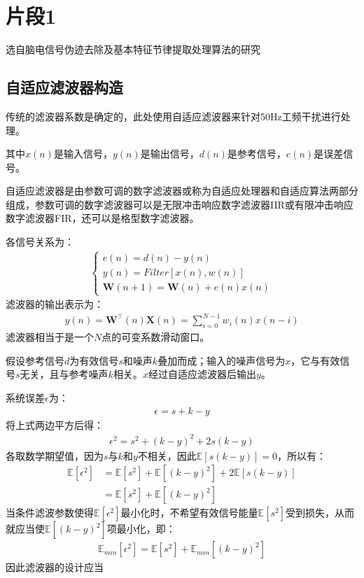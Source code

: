 \documentclass{ctexart}
\begin{document}
	\section{片段1}
		选自脑电信号伪迹去除及基本特征节律提取处理算法的研究\cite{脑电信号伪迹去除及基本特征节律提取处理算法的研究}
		\subsection{自适应滤波器构造}
			传统的滤波器系数是确定的，此处使用自适应滤波器来针对50Hz工频干扰进行处理。\par
			其中$x(n)$是输入信号，$y(n)$是输出信号，$d(n)$是参考信号，$e(n)$是误差信号。\par
			
			自适应滤波器是由参数可调的数字滤波器或称为自适应处理器和自适应算法两部分组成，参数可调的数字滤波器可以是无限冲击响应数字滤波器IIR或有限冲击响应数字滤波器FIR，还可以是格型数字滤波器。\par
			各信号关系为：
			\begin{gather}
				\begin{cases}
					e(n)=d(n)-y(n)\\
					y(n)=Filter[x(n),w(n)]\\
					\bm{W}(n+1)=\bm{W}(n)+e(n)x(n)
				\end{cases}
			\end{gather}
			滤波器的输出表示为：
			\begin{gather}
				y(n)=\bm{W}^\top(n)\bm{X}(n)=\sum_{i=0}^{N-1}w_i(n)x(n-i)
			\end{gather}
			滤波器相当于是一个$N$点的可变系数滑动窗口。\par
			假设参考信号$d$为有效信号$s$和噪声$k$叠加而成；输入的噪声信号为$x$，它与有效信号$s$无关，且与参考噪声$k$相关。$x$经过自适应滤波器后输出$y$。\par
			系统误差$\epsilon$为：
			\begin{gather}
				\epsilon=s+k-y
			\end{gather}
			将上式两边平方后得：
			\begin{gather}
				\epsilon^2=s^2+(k-y)^2+2s(k-y)
			\end{gather}
			各取数学期望值，因为$s$与$k$和$y$不相关，因此$\mathbb{E}[s(k-y)]=0$，所以有：
			\begin{align}
				\mathbb{E}[\epsilon^2]&=\mathbb{E}[s^2]+\mathbb{E}[(k-y)^2]+2\mathbb{E}[s(k-y)]\\
				&=\mathbb{E}[s^2]+\mathbb{E}[(k-y)^2]
			\end{align}
			当条件滤波参数使得$\mathbb{E}[\epsilon^2]$最小化时，不希望有效信号能量$\mathbb{E}[s^2]$受到损失，从而就应当使$\mathbb{E}[(k-y)^2]$项最小化，即：
			\begin{gather}
				\mathbb{E}_{min}[\epsilon^2]=\mathbb{E}[s^2]+\mathbb{E}_{min}[(k-y)^2]
			\end{gather}
			因此滤波器的设计应当
			
	
	\newpage
	
	
	\newpage
	
	
	
\end{document}
